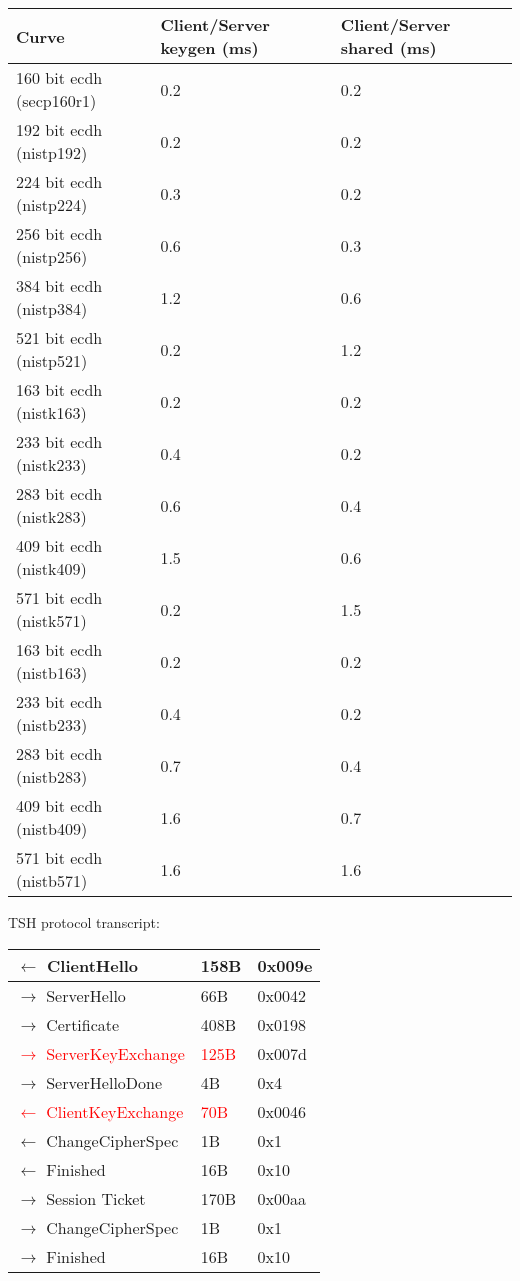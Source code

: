 \documentclass[12pt]{article}
\begin{document}
\begin{center}
    \begin{tabular}{| l | l | l |}
    \hline
    Curve & Client/Server keygen (ms) & Client/Server shared (ms) \\ \hline
    160 bit ecdh (secp160r1)  & 0.2   & 0.2 \\ \hline
    192 bit ecdh (nistp192)   & 0.2   & 0.2 \\ \hline
    224 bit ecdh (nistp224)   & 0.3   & 0.2 \\ \hline
    256 bit ecdh (nistp256)   & 0.6   & 0.3 \\ \hline
    384 bit ecdh (nistp384)   & 1.2   & 0.6 \\ \hline
    521 bit ecdh (nistp521)   & 0.2   & 1.2 \\ \hline
    163 bit ecdh (nistk163)   & 0.2   & 0.2 \\ \hline
    233 bit ecdh (nistk233)   & 0.4   & 0.2 \\ \hline
    283 bit ecdh (nistk283)   & 0.6   & 0.4 \\ \hline
    409 bit ecdh (nistk409)   & 1.5   & 0.6 \\ \hline
    571 bit ecdh (nistk571)   & 0.2   & 1.5 \\ \hline
    163 bit ecdh (nistb163)   & 0.2   & 0.2 \\ \hline
    233 bit ecdh (nistb233)   & 0.4   & 0.2 \\ \hline
    283 bit ecdh (nistb283)   & 0.7   & 0.4 \\ \hline
    409 bit ecdh (nistb409)   & 1.6   & 0.7 \\ \hline
    571 bit ecdh (nistb571)   & 1.6   & 1.6 \\ \hline
    \end{tabular}
\end{center}

TSH protocol transcript:
\begin{center}
    \begin{tabular}{| l | l | l |}
    \hline
    $\leftarrow$ ClientHello & 158B & 0x009e\\ \hline
    $\rightarrow$ ServerHello & 66B & 0x0042\\ \hline
    $\rightarrow$ Certificate & 408B & 0x0198\\ \hline
    \textcolor{red}{$\rightarrow$ ServerKeyExchange} & \textcolor{red}{125B} & 0x007d\\ \hline
    $\rightarrow$ ServerHelloDone & 4B & 0x4\\ \hline
    \textcolor{red}{$\leftarrow$ ClientKeyExchange} & \textcolor{red}{70B} & 0x0046\\ \hline
    $\leftarrow$ ChangeCipherSpec & 1B & 0x1\\ \hline
    $\leftarrow$ Finished & 16B & 0x10\\ \hline
    $\rightarrow$ Session Ticket & 170B & 0x00aa\\ \hline
    $\rightarrow$ ChangeCipherSpec & 1B & 0x1\\ \hline
    $\rightarrow$ Finished & 16B & 0x10\\ \hline
    \end{tabular}
\end{center}
\end{document}
